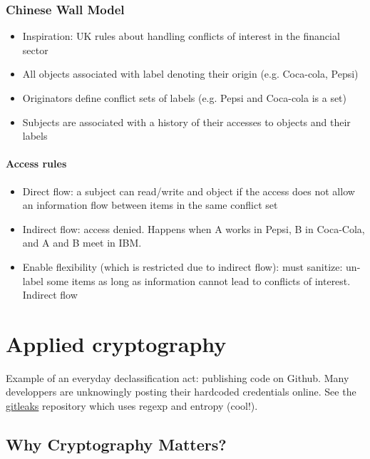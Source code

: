 \documentclass{article}
\newenvironment{myitemize}
{ \begin{itemize}
    \setlength{\itemsep}{005pt}
    \setlength{\parskip}{0pt}
    \setlength{\parsep}{0pt}     }
{ \end{itemize}                  }
\begin{document}
\begin{multicols}{2}
\subsubsection{Chinese Wall Model}

\begin{myitemize}
    \item Inspiration: UK rules about handling conflicts of interest in the financial sector
    \item All objects associated with label denoting their origin (e.g. Coca-cola, Pepsi)
    \item Originators define conflict sets of labels (e.g. Pepsi and Coca-cola is a set)
    \item Subjects are associated with a history of their accesses to objects and their labels

\end{myitemize}

\paragraph{Access rules}

\begin{myitemize}
    \item Direct flow: a subject can read/write and object if the access does not allow an information flow between items in the same conflict set
    \item Indirect flow: access denied. Happens when A works in Pepsi, B in Coca-Cola, and A and B meet in IBM. 
    \item Enable flexibility (which is restricted due to indirect flow): must sanitize: un-label some items as long as information cannot lead to conflicts of interest. Indirect flow 
\end{myitemize}



\section{Applied cryptography}

Example of an everyday declassification act: publishing code on Github. Many developpers are unknowingly posting their hardcoded credentials online. See the \href{https://github.com/zricethezav/gitleaks}{gitleaks} repository which uses regexp and entropy (cool!). 

\subsection{Why Cryptography Matters?}


\end{multicols}
\end{document}
